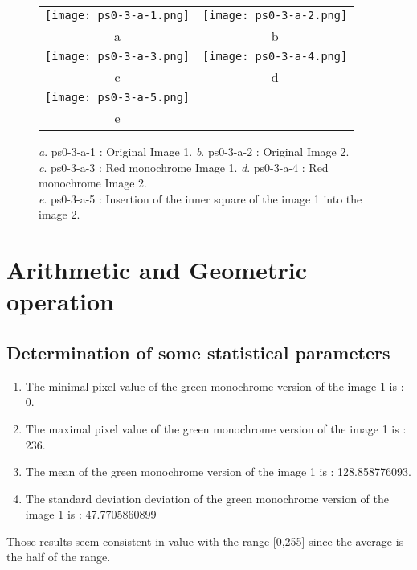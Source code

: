 \documentclass[a4paper,11pt]{article}
\begin{document}
 \begin{figure}[H]
\begin{center}
\begin{tabular}{cc}
	\texttt{[image: ps0-3-a-1.png]}&
	\texttt{[image: ps0-3-a-2.png]}\\
	a&b\\
	\texttt{[image: ps0-3-a-3.png]}&
	\texttt{[image: ps0-3-a-4.png]}\\
	c&d\\
	\texttt{[image: ps0-3-a-5.png]}\\
	e
\end{tabular}
\end{center}
\caption{ 
\textit{a}. ps0-3-a-1 : Original Image 1. \textit{b}. ps0-3-a-2 : Original Image 2. \\
\textit{c}. ps0-3-a-3 : Red monochrome Image 1. \textit{d}. ps0-3-a-4 : Red monochrome Image 2.\\
\textit{e}. ps0-3-a-5 : Insertion of the inner square of the image 1 into the image 2.}
\label{ps0-3-as}
\end{figure}

\section{Arithmetic and Geometric operation}
\subsection{Determination of some statistical parameters}

\begin{enumerate}
\item The minimal pixel value of the green monochrome version of the image 1 is :  0.\\
\item The maximal pixel value of the green monochrome version of the image 1 is :  236.\\
\item The mean of the green monochrome version of the image 1 is :  128.858776093.\\
\item The standard deviation deviation of the green monochrome version of the image 1 is :  47.7705860899\\
\end{enumerate}
Those results seem consistent in value with the range [0,255] since the average is the half of the range.
\end{document}
